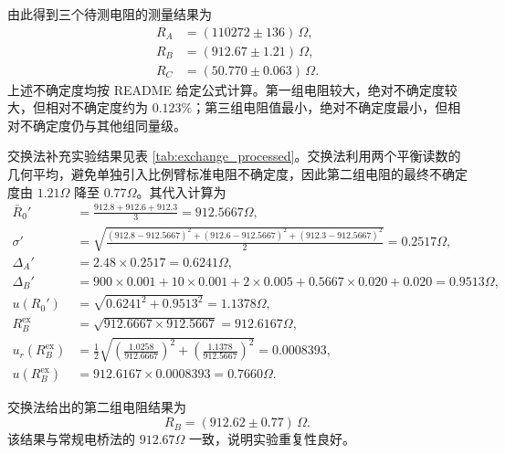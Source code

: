 \documentclass[UTF8,a4paper,12pt]{ctexart}
\begin{document}
由此得到三个待测电阻的测量结果为
\begin{align*}
  R_A &= (110272 \pm 136)\,\Omega,\\
  R_B &= (912.67 \pm 1.21)\,\Omega,\\
  R_C &= (50.770 \pm 0.063)\,\Omega.
\end{align*}
上述不确定度均按 README 给定公式计算。第一组电阻较大，绝对不确定度较大，但相对不确定度约为 $0.123\%$；第三组电阻值最小，绝对不确定度最小，但相对不确定度仍与其他组同量级。

交换法补充实验结果见表 \ref{tab:exchange_processed}。交换法利用两个平衡读数的几何平均，避免单独引入比例臂标准电阻不确定度，因此第二组电阻的最终不确定度由 $1.21\Omega$ 降至 $0.77\Omega$。其代入计算为
{\small
\begin{align*}
\bar R_0'&=\frac{912.8+912.6+912.3}{3}=912.5667\Omega,\\
\sigma'&=\sqrt{\frac{(912.8-912.5667)^2+(912.6-912.5667)^2+(912.3-912.5667)^2}{2}}=0.2517\Omega,\\
\Delta_A'&=2.48\times0.2517=0.6241\Omega,\\
\Delta_B'&=900\times0.001+10\times0.001+2\times0.005+0.5667\times0.020+0.020=0.9513\Omega,\\
 u(R_0')&=\sqrt{0.6241^2+0.9513^2}=1.1378\Omega,\\
 R_B^{\mathrm{ex}}&=\sqrt{912.6667\times912.5667}=912.6167\Omega,\\
 u_r(R_B^{\mathrm{ex}})&=\frac{1}{2}\sqrt{\left(\frac{1.0258}{912.6667}\right)^2+\left(\frac{1.1378}{912.5667}\right)^2}=0.0008393,\\
 u(R_B^{\mathrm{ex}})&=912.6167\times0.0008393=0.7660\Omega.
\end{align*}}

\begin{table}[H]
\centering
\caption{第二组交换法补充实验数据处理结果}
\label{tab:exchange_processed}
\end{table}

交换法给出的第二组电阻结果为
\begin{equation*}
  R_B=(912.62\pm0.77)\,\Omega .
\end{equation*}
该结果与常规电桥法的 $912.67\Omega$ 一致，说明实验重复性良好。
\end{document}
